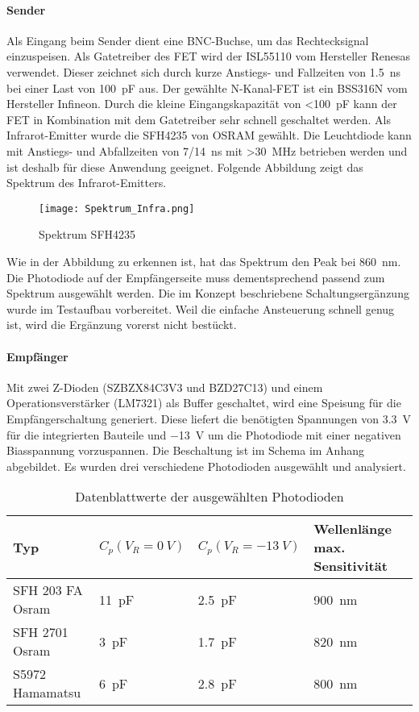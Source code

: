 \paragraph{Sender} 
Als Eingang beim Sender dient eine BNC-Buchse, um das Rechtecksignal einzuspeisen. Als Gatetreiber des FET wird der ISL55110 vom Hersteller Renesas verwendet. Dieser zeichnet sich durch kurze Anstiegs- und Fallzeiten von \SI{1.5}{ns} bei einer Last von \SI{100}{pF} aus.
Der gewählte N-Kanal-FET ist ein BSS316N vom Hersteller Infineon. Durch die kleine Eingangskapazität von \textless \SI{100}{pF} kann der FET in Kombination mit dem Gatetreiber sehr schnell geschaltet werden.
Als Infrarot-Emitter wurde die SFH4235 von OSRAM gewählt. Die Leuchtdiode kann mit Anstiegs- und Abfallzeiten von 7/\SI{14}{ns} mit \textgreater \SI{30}{MHz} betrieben werden und ist deshalb für diese Anwendung geeignet. Folgende Abbildung zeigt das Spektrum des Infrarot-Emitters.

\begin{figure}[h]
	\centering
	\texttt{[image: Spektrum\_Infra.png]}
	\caption{Spektrum SFH4235}\label{fig:Spektrum_Infra}
\end{figure}

Wie in der Abbildung zu erkennen ist, hat das Spektrum den Peak bei \SI{860}{nm}. Die Photodiode auf der Empfängerseite muss dementsprechend passend zum Spektrum ausgewählt werden. Die im Konzept beschriebene Schaltungsergänzung wurde im Testaufbau vorbereitet. Weil die einfache Ansteuerung schnell genug ist, wird die Ergänzung vorerst nicht bestückt.

\paragraph{Empfänger}
Mit zwei Z-Dioden (SZBZX84C3V3 und BZD27C13) und einem Operationsverstärker (LM7321) als Buffer geschaltet, wird eine Speisung für die Empfängerschaltung generiert. Diese liefert die benötigten Spannungen von \SI{3.3}{V} für die integrierten Bauteile und \SI{-13}{V} um die Photodiode mit einer negativen Biasspannung vorzuspannen. Die Beschaltung ist im Schema im Anhang abgebildet.
\newline
Es wurden drei verschiedene Photodioden ausgewählt und analysiert.

\begin{table}[H]
\begin{tabular}{|l|l|l|l|}
	\hline 
	\textbf{Typ}&\textbf{$C_{p} (V_{R}=\SI{0}{V})$}  & \textbf{$C_{p} (V_{R}=\SI{-13}{V})$} & \textbf{Wellenlänge max. Sensitivität} \\ 
	\hline 
	SFH 203 FA Osram&\SI{11}{pF}  & \SI{2.5}{pF} & \SI{900}{nm} \\ 
	\hline 
	SFH 2701 Osram&\SI{3}{pF}  &\SI{1.7}{pF}  &\SI{820}{nm}  \\ 
	\hline 
	S5972 Hamamatsu&\SI{6}{pF}  &\SI{2.8}{pF}  &\SI{800}{nm}  \\ 
	\hline 
\end{tabular} 
\caption{Datenblattwerte der ausgewählten Photodioden}\label{tab:Tabelle_Photo}
\end{table}

